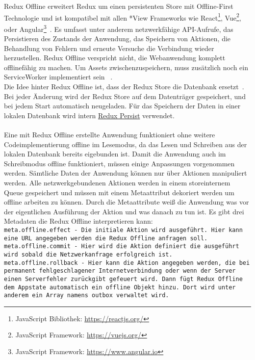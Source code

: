 % 
Redux Offline erweitert Redux um einen persistenten Store mit Offline-First Technologie und  ist kompatibel mit allen *View Frameworks wie React\footnote{JavaScript Bibliothek: \url{https://reactjs.org/}}, Vue\footnote{JavaScript Framework: \url{https://vuejs.org/}}, oder Angular\footnote{JavaScript Framework: \url{https://www.angular.io}}~\cite{redux-offline-compabilaty}.
Es umfasst unter anderem netzwerkfähige \gls{API}-Aufrufe, das Persistieren des Zustands der Anwendung, das Speichern von Aktionen, die Behandlung von Fehlern und erneute Versuche die Verbindung wieder herzustellen.
Redux Offline verspricht nicht, die Webanwendung komplett offlinefähig zu machen. Um \gls{Assets} zwischenzuspeichern, muss zusätzlich noch ein ServiceWorker implementiert sein ~\cite{redux-offline-gh}.\\
Die Idee hinter Redux Offline ist, dass der Redux Store die Datenbank ersetzt~\cite{redux-offline}. Bei jeder Änderung wird der Redux Store auf dem Datenträger gespeichert, und bei jedem Start automatisch neugeladen. Für das Speichern der Daten in einer lokalen Datenbank wird intern \hyperref[sub:reduxpersist]{Redux Persist} verwendet.\\\\
Eine mit Redux Offline erstellte Anwendung funktioniert ohne weitere Codeimplementierung offline im Lesemodus, da das Lesen und Schreiben aus der lokalen Datenbank bereits eigebunden ist.
Damit die Anwendung auch im Schreibmodus offline funktioniert, müssen einige Anpassungen vorgenommen werden.
Sämtliche Daten der Anwendung können nur über Aktionen manipuliert werden. 
Alle netzwerkgebundenen Aktionen werden  in einem storeinternem \gls{Queue} gespeichert und müssen mit einem Metaattribut dekoriert werden um offline arbeiten zu können. Durch die Metaattribute weiß die Anwendung was vor der eigentlichen Ausführung der Aktion und was danach zu tun ist. 
Es gibt drei Metadaten die Redux Offline interpretieren kann:\\
\tt{meta.offline.effect} - Die initiale Aktion wird ausgeführt. Hier kann eine URL angegeben werden die Redux Offline anfragen soll.\\
\tt{meta.offline.commit} - Hier wird die Aktion definiert die ausgeführt wird sobald die Netzwerkanfrage erfolgreich ist.\\
\tt{meta.offline.rollback} - Hier kann die Aktion angegeben werden, die bei  permanent fehlgeschlagener Internetverbindung oder wenn der Server einen Serverfehler zurückgibt gefeuert wird.
Dann fügt Redux Offline dem \gls{App}state automatisch ein \tt{offline} Objekt hinzu. Dort wird unter anderem ein Array namens \tt{outbox} verwaltet wird.

